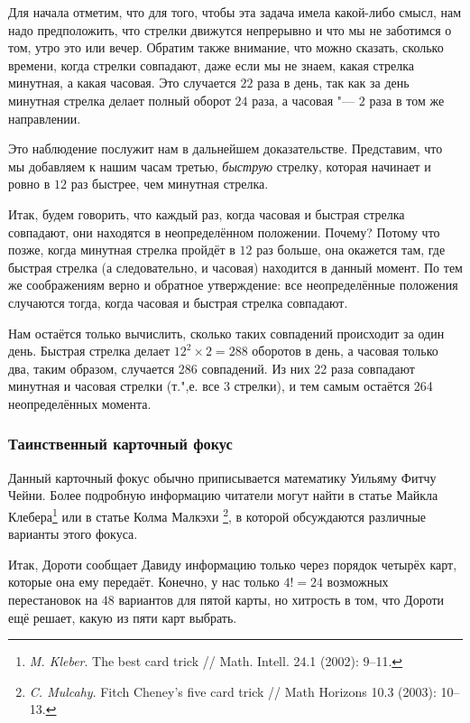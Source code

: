 \documentclass[twoside]{book}
\begin{document}

Для начала отметим, что для того, чтобы эта задача имела какой-либо смысл, нам надо предположить, что стрелки движутся непрерывно и что мы не заботимся о том, утро это или вечер.
Обратим также внимание, что можно сказать, сколько времени, когда стрелки совпадают, даже если мы не знаем, какая стрелка минутная, а какая часовая.
Это случается $22$ раза в день, так как за день минутная стрелка делает полный оборот $24$ раза, а часовая "--- $2$ раза в том же направлении.

Это наблюдение послужит нам в дальнейшем доказательстве.
Представим, что мы добавляем к нашим часам третью, \emph{быструю} стрелку, которая начинает  и ровно в $12$ раз быстрее, чем минутная стрелка.

Итак, будем говорить, что каждый раз, когда часовая и быстрая стрелка совпадают, они находятся в неопределённом положении.
Почему?
Потому что позже, когда минутная стрелка пройдёт в $12$ раз больше, она окажется там, где быстрая стрелка (а следовательно, и часовая) находится в данный момент.
По тем же соображениям верно и обратное утверждение: все неопределённые положения случаются тогда, когда часовая и быстрая стрелка совпадают.

Нам остаётся только вычислить, сколько таких совпадений происходит за один день.
Быстрая стрелка делает $12^2\times 2 = 288$ оборотов в день, а часовая только два, таким образом, случается 286 совпадений.
Из них 22 раза совпадают минутная и часовая стрелки (т.",е. все $3$ стрелки), и тем самым остаётся 264 неопределённых момента. 
\heart

\subsubsection*{Таинственный карточный фокус}%

Данный карточный фокус обычно приписывается математику Уильяму Фитчу Чейни. %
Более подробную информацию читатели могут найти в статье Майкла Клебера\footnote{\emph{M. Kleber}. The best card trick /\!/ {Math. Intell.} 24.1 (2002): 9--11.}
или в статье Колма Малкэхи%
\footnote{\emph{C. Mulcahy}. Fitch Cheney's five card trick /\!/ {Math Horizons} 10.3 (2003): 10--13.}, в которой обсуждаются различные варианты этого фокуса.


Итак, Дороти сообщает Давиду информацию только через порядок четырёх карт, которые она ему передаёт.
Конечно, у нас только $4!=24$ возможных перестановок на $48$ вариантов для пятой карты, но хитрость в том, что Дороти ещё решает, какую из пяти карт выбрать.
\end{document}
